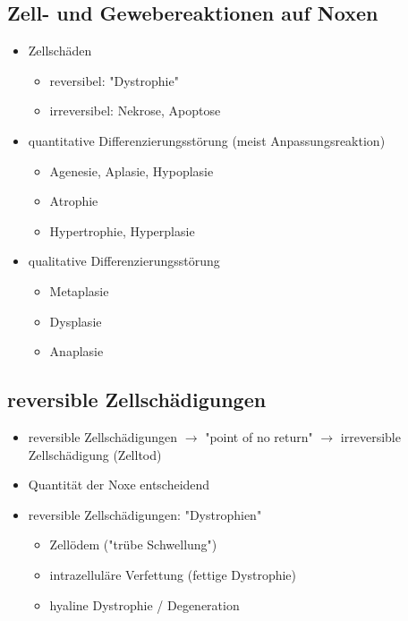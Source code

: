 \subsection{Zell- und Gewebereaktionen auf Noxen}
	\begin{itemize}
		\item Zellschäden
			\begin{itemize}
				\item reversibel: "Dystrophie"
				\item irreversibel: Nekrose, Apoptose
			\end{itemize}
		\item quantitative Differenzierungsstörung (meist Anpassungsreaktion)
			\begin{itemize}
				\item Agenesie, Aplasie, Hypoplasie
				\item Atrophie
				\item Hypertrophie, Hyperplasie
			\end{itemize}
		\item qualitative Differenzierungsstörung
			\begin{itemize}
				\item Metaplasie
				\item Dysplasie
				\item Anaplasie
			\end{itemize}
	\end{itemize}

\subsection{reversible Zellschädigungen}
	\begin{itemize}
		\item reversible Zellschädigungen  $\rightarrow$  "point of no return"  $\rightarrow$  irreversible Zellschädigung (Zelltod)
		\item Quantität der Noxe entscheidend
		\item reversible Zellschädigungen: "Dystrophien"
			\begin{itemize}
				\item Zellödem ("trübe Schwellung")
				\item intrazelluläre Verfettung (fettige Dystrophie)
				\item hyaline Dystrophie / Degeneration
			\end{itemize}
	\end{itemize}


